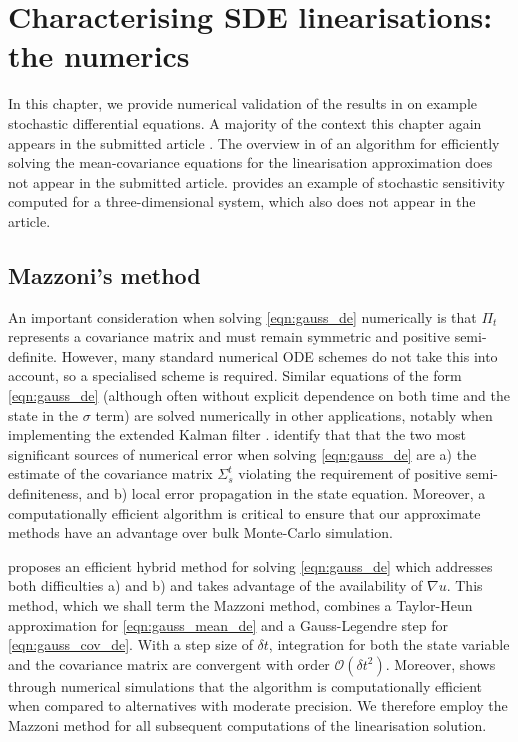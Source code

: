 
\chapter{Characterising SDE linearisations: the numerics}\label{ch:linear_numerics}
In this chapter, we provide numerical validation of the results in  on example stochastic differential equations.
A majority of the context this chapter again appears in the submitted article \citep{BlakeEtAl_2023_ConvergenceStochasticDifferential}.
The overview in  of an algorithm for efficiently solving the mean-covariance equations for the linearisation approximation does not appear in the submitted article.
 provides an example of stochastic sensitivity computed for a three-dimensional system, which also does not appear in the article.

\section{Mazzoni's method}\label{sec:mazzoni}
An important consideration  when solving \cref{eqn:gauss_de} numerically is that \(\Pi_t\) represents a covariance matrix and must remain symmetric and positive semi-definite.
However, many standard numerical ODE schemes do not take this into account, so a specialised scheme is required.
Similar equations of the form \cref{eqn:gauss_de} (although often without explicit dependence on both time and the state in the \(\sigma\) term) are solved numerically in other applications, notably when implementing the extended Kalman filter \citep{Jazwinski_2014_StochasticProcessesFiltering, KulikovaKulikov_2014_AdaptiveODESolvers}.
\citet{KulikovaKulikov_2014_AdaptiveODESolvers} identify that that the two most significant sources of numerical error when solving \cref{eqn:gauss_de} are a) the estimate of the covariance matrix \(\Sigma_s^t\) violating the requirement of positive semi-definiteness, and b) local error propagation in the state equation.
Moreover, a computationally efficient algorithm is critical to ensure that our approximate methods have an advantage over bulk Monte-Carlo simulation.

\citet{Mazzoni_2008_ComputationalAspectsContinuous} proposes an efficient hybrid method for solving \cref{eqn:gauss_de} which addresses both difficulties a) and b) and takes advantage of the availability of \(\nabla u\).
This method, which we shall term the Mazzoni method, combines a Taylor-Heun approximation for \cref{eqn:gauss_mean_de} and a Gauss-Legendre step for \cref{eqn:gauss_cov_de}.
With a step size of \(\delta t\), integration for both the state variable and the covariance matrix are convergent with order \(\mathcal{O}\!\left(\delta t^2\right)\).
Moreover, \citet{Mazzoni_2008_ComputationalAspectsContinuous} shows through numerical simulations that the algorithm is computationally efficient when compared to alternatives with moderate precision.
We therefore employ the Mazzoni method for all subsequent computations of the linearisation solution.

